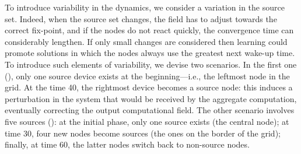 To introduce variability in the dynamics, we consider a variation in the source set. 
%
Indeed, 
 when the source set changes, 
 the field has to adjust towards the correct fix-point, 
 and if the nodes do not react quickly, 
 the convergence time can considerably lengthen.
%
If only small changes are considered 
 then learning could promote solutions in which the nodes always 
 use the greatest next wake-up time. %
%
To introduce such elements of variability, 
 we devise two scenarios. 
 In the first one (\swapscen{}), 
 only one source device exists at the beginning---i.e., the leftmost node in the grid. 
%
At the time 40, 
 the rightmost device becomes a source node:
 this induces a perturbation in the system
 that would 
 be received by the aggregate computation,
 eventually correcting the output computational field.
%
The other scenario involves five sources (\multiswap{}):
 at the initial phase, only one source exists (the central node);
 at time 30, four new nodes become sources (the ones on the border of the grid); finally, 
 at time 60, the latter nodes switch back to non-source nodes.

